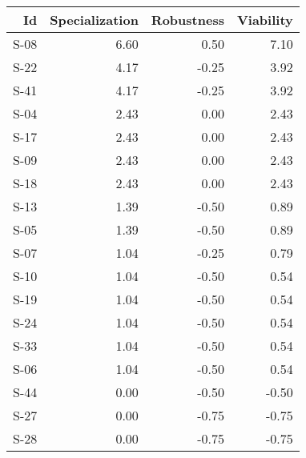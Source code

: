 \begin{tabular}{ | r | r | r | r | }
    \hline
                    Id  &  Specialization  &      Robustness  &       Viability  \\
    \hline
    \hline
                  S-08  &            6.60  &            0.50  &            7.10  \\
    \hline
                  S-22  &            4.17  &           -0.25  &            3.92  \\
    \hline
                  S-41  &            4.17  &           -0.25  &            3.92  \\
    \hline
                  S-04  &            2.43  &            0.00  &            2.43  \\
    \hline
                  S-17  &            2.43  &            0.00  &            2.43  \\
    \hline
                  S-09  &            2.43  &            0.00  &            2.43  \\
    \hline
                  S-18  &            2.43  &            0.00  &            2.43  \\
    \hline
                  S-13  &            1.39  &           -0.50  &            0.89  \\
    \hline
                  S-05  &            1.39  &           -0.50  &            0.89  \\
    \hline
                  S-07  &            1.04  &           -0.25  &            0.79  \\
    \hline
                  S-10  &            1.04  &           -0.50  &            0.54  \\
    \hline
                  S-19  &            1.04  &           -0.50  &            0.54  \\
    \hline
                  S-24  &            1.04  &           -0.50  &            0.54  \\
    \hline
                  S-33  &            1.04  &           -0.50  &            0.54  \\
    \hline
                  S-06  &            1.04  &           -0.50  &            0.54  \\
    \hline
                  S-44  &            0.00  &           -0.50  &           -0.50  \\
    \hline
                  S-27  &            0.00  &           -0.75  &           -0.75  \\
    \hline
                  S-28  &            0.00  &           -0.75  &           -0.75  \\

\end{tabular}
